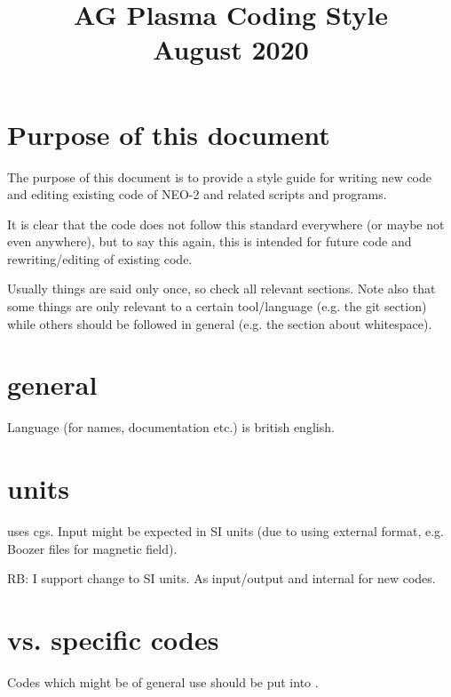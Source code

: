\documentclass{article}
\title{\textbf{AG Plasma Coding Style\\August 2020}}
\begin{document}
\maketitle

\section{Purpose of this document}
The purpose of this document is to provide a style guide for writing new
code and editing existing code of NEO-2 and related scripts and
programs.

It is clear that the code does not follow this standard everywhere (or
maybe not even anywhere), but to say this again, this is intended for
future code and rewriting/editing of existing code.

Usually things are said only once, so check all relevant sections.
Note also that some things are only relevant to a certain tool/language
(e.g. the git section) while others should be followed in general (e.g.
the section about whitespace).

\section{general}
Language (for names, documentation etc.) is british english.

\section{units}
\neotwo uses cgs. Input might be expected in SI units (due
to using external format, e.g. Boozer files for magnetic field).

RB: I support change to SI units. As input/output and internal for new
codes.

\section{\libneo vs. specific codes}
Codes which might be of general use should be put into \libneo.
\end{document}

